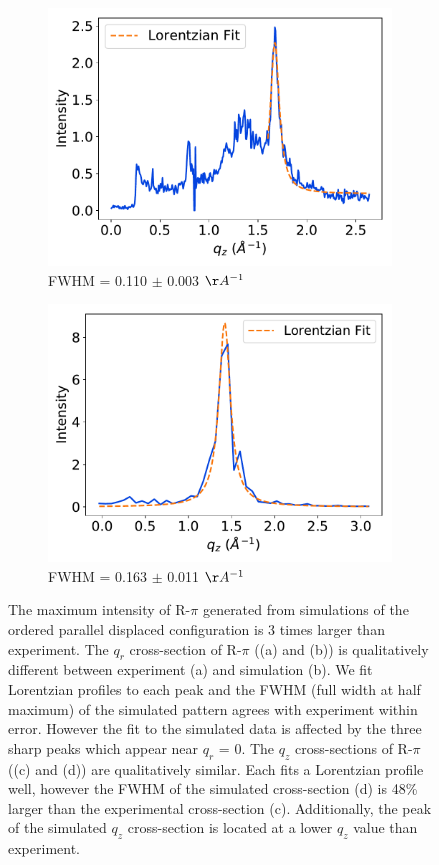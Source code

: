 \documentclass[journal=jpcbfk,manuscript=article]{achemso}
\begin{document}
\begin{figure}
\begin{subfigure}{0.45\textwidth}
  \includegraphics[width=\textwidth]{exp_zsection_fit.pdf}
  \caption{FWHM = 0.110 $\pm$ 0.003 $\AA^{-1}$}\label{fig:exp_zsection_fit}
  \end{subfigure}
  \begin{subfigure}{0.45\textwidth}
  \includegraphics[width=\textwidth]{sim_zsection_fit.pdf}
  \caption{FWHM = 0.163 $\pm$ 0.011 $\AA^{-1}$}\label{fig:sim_zsection_fit}
  \end{subfigure}
  \caption{
	  The maximum intensity of R-$\pi$ generated from simulations of the ordered
	  parallel displaced configuration is 3 times larger than experiment. The $q_r$
	  cross-section of R-$\pi$ ((a) and (b)) is qualitatively different between
	  experiment (a) and simulation (b). We fit Lorentzian profiles to each peak and
	  the FWHM (full width at half maximum) of the simulated pattern agrees with
	  experiment within error. However the fit to the simulated data is affected by
	  the three sharp peaks which appear near $q_r$ = 0. The $q_z$ cross-sections of
	  R-$\pi$ ((c) and (d)) are qualitatively similar. Each fits a Lorentzian profile
	  well, however the FWHM of the simulated cross-section (d) is 48\% larger than
	  the experimental cross-section (c). Additionally, the peak of the simulated
	  $q_z$ cross-section is located at a lower $q_z$ value than
	  experiment.}\label{fig:rpi_exp_comparison}
  \end{figure}
\end{document}

